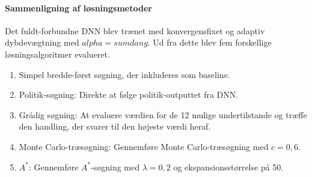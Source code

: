 \documentclass[../main.tex]{subfiles}
\begin{document}
\paragraph{Sammenligning af løsningsmetoder}
Det fuldt-forbundne DNN blev trænet med konvergensfixet og adaptiv dybdevægtning med \(alpha=sumdang\). 
Ud fra dette blev fem forskellige løsningsalgoritmer evalueret.
\begin{enumerate}
	\item Simpel bredde-først søgning, der inkluderes som baseline.
	\item Politik-søgning: Direkte at følge politik-outputtet fra DNN.
	\item Grådig søgning: At evaluere værdien for de 12 mulige undertilstande og træffe den handling, der svarer til den højeste værdi heraf.
	\item Monte Carlo-træsøgning: Gennemføre Monte Carlo-træsøgning med \(c=0,6\).
	\item \(A^*\): Gennemføre \(A^*\)-søgning med \(\lambda=0,2\) og ekspansionsstørrelse på 50.
\end{enumerate}
\end{document}
